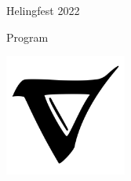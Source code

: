 \documentclass{article}
\begin{document}
\begin{landscape}
\begin{multicols}{3}
\begin{center}
\columnbreak

\null

\bigskip
\bigskip
\bigskip
\Large
Helingfest 2022 %

\bigskip
\large
Program


\bigskip
\bigskip
\bigskip
\begin{center}
\includegraphics[width=0.3\textwidth]{bilder/nabla.jpg}
\end{center}
\end{center}


\end{multicols}
\end{landscape}
\end{document}

